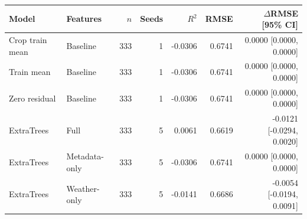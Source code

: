 \begin{tabular}{@{}llrrrrr@{}}
\toprule
Model & Features & $n$ & Seeds & $R^2$ & RMSE & $\Delta$RMSE [95\% CI] \\
\midrule
Crop train mean & Baseline & 333 & 1 & -0.0306 & 0.6741 & 0.0000 [0.0000, 0.0000] \\
Train mean & Baseline & 333 & 1 & -0.0306 & 0.6741 & 0.0000 [0.0000, 0.0000] \\
Zero residual & Baseline & 333 & 1 & -0.0306 & 0.6741 & 0.0000 [0.0000, 0.0000] \\
ExtraTrees & Full & 333 & 5 & 0.0061 & 0.6619 & -0.0121 [-0.0294, 0.0020] \\
ExtraTrees & Metadata-only & 333 & 5 & -0.0306 & 0.6741 & 0.0000 [0.0000, 0.0000] \\
ExtraTrees & Weather-only & 333 & 5 & -0.0141 & 0.6686 & -0.0054 [-0.0194, 0.0091] \\
\bottomrule
\end{tabular}
